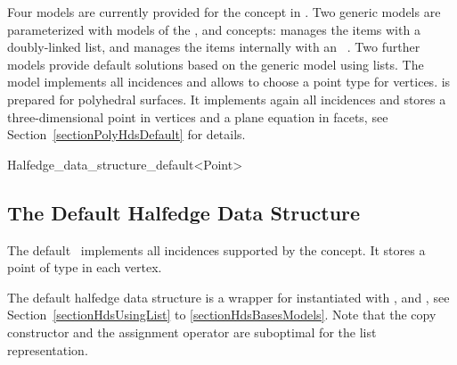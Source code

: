 Four models are currently provided for the
 concept in \cgal. Two generic models are
parameterized with models of the ,
 and  concepts:
 manages the items with a
doubly-linked list, and 
manages the items internally with an \stl\ . Two
further models provide default solutions based on the generic model
using lists. The model 
implements all incidences and allows to choose a point type for
vertices.   is
prepared for polyhedral surfaces. It implements again all incidences
and stores a three-dimensional point in vertices and a plane equation
in facets, see Section~\ref{sectionPolyHdsDefault} for details.


\begin{ccClassTemplate}{Halfedge_data_structure_default<Point>}
\subsection{The Default Halfedge Data Structure}
\label{sectionHdsDefault}


\ccDefinition

The default \ccClassTemplateName\ implements all incidences supported
by the  concept. It stores a point of
type  in each vertex.


\ccImplementation

The default halfedge data structure is a wrapper for
 instantiated with
,  and
, see Section~\ref{sectionHdsUsingList} to
\ref{sectionHdsBasesModels}. Note that the copy constructor
and the assignment operator are suboptimal for the list representation.

\end{ccClassTemplate}



